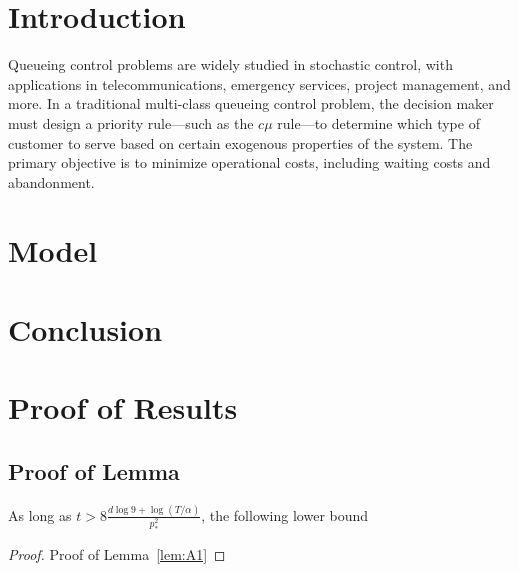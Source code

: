 \documentclass[opre,sglanonrev]{style/informs4}
\begin{document}



\maketitle

\section{Introduction}

Queueing control problems are widely studied in stochastic control, with applications in telecommunications, emergency services, project management, and more. In a traditional multi-class queueing control problem, the decision maker must design a priority rule—such as the $c\mu$ rule—to determine which type of customer to serve based on certain exogenous properties of the system. The primary objective is to minimize operational costs, including waiting costs and abandonment.


\cite{Erlang1948,Dantzig1955,Dynkin1956,Bellman1957DP,Little1961,Skorokhod1961,McKean1965,Iglehart1965}

\section{Model}



\section{Conclusion}




\ECSwitch
{}

\section{Proof of Results}

\subsection{Proof of Lemma}

\begin{lemma}
	\label{lem:A1}
    As long as $t>8 \frac{d \log 9 +\log (T/\alpha)}{p_{*}^2}$, the following lower bound
\end{lemma}

\begin{proof}{Proof of Lemma~\ref{lem:A1}}
\Halmos
\end{proof}



\end{document}

